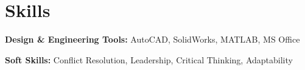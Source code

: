 \documentclass[letterpaper,11pt]{article}
\newcommand{\resumeSubHeadingListStart}{\begin{itemize}[leftmargin=0.15in, label={}]}
\newcommand{\resumeSubHeadingListEnd}{\end{itemize}}
\begin{document}

\section{Skills}
  \vspace{2pt}
  \resumeSubHeadingListStart
    \small{\item{

  
    \textbf{Design & Engineering Tools:}{  AutoCAD, SolidWorks, MATLAB, MS Office} \ \vspace{3pt}

    \textbf{Soft Skills:}{ Conflict Resolution, Leadership, Critical Thinking, Adaptability} \ \vspace{3pt}

}}
\resumeSubHeadingListEnd


\end{document}
